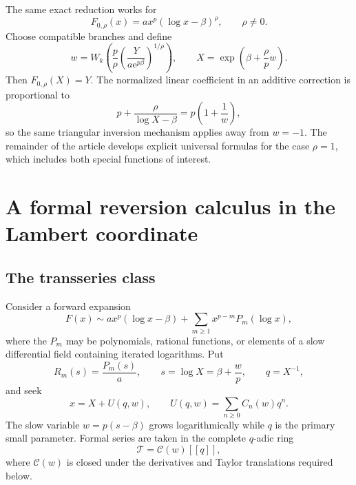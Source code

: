 \documentclass[11pt,a4paper]{article}
\numberwithin{equation}{section}
\theoremstyle{definition}
\theoremstyle{remark}
\newcommand{\e}{\mathrm e}
\newcommand{\Cfield}{\mathscr C}
\newcommand{\Tfield}{\mathscr T}
\begin{document}
The same exact reduction works for
\begin{equation}
 F_{0,\rho}(x)=a x^p(\log x-\beta)^\rho,
 \qquad \rho\neq0.
 \label{eq:F0-rho}
\end{equation}
Choose compatible branches and define
\begin{equation}
 w=W_k\!\left(
 \frac{p}{\rho}
 \left(\frac{Y}{a\e^{p\beta}}\right)^{1/\rho}
 \right),
 \qquad
 X=\exp\!\left(\beta+\frac{\rho}{p}w\right).
 \label{eq:rho-normalizer}
\end{equation}
Then \(F_{0,\rho}(X)=Y\).  The normalized linear coefficient in an
additive correction is proportional to
\begin{equation}
 p+\frac{\rho}{\log X-\beta}=p\left(1+\frac1w\right),
 \label{eq:rho-jacobian}
\end{equation}
so the same triangular inversion mechanism applies away from \(w=-1\).
The remainder of the article develops explicit universal formulas for the
case \(\rho=1\), which includes both special functions of interest.

\section{A formal reversion calculus in the Lambert coordinate}

\subsection{The transseries class}

Consider a forward expansion
\begin{equation}
 F(x)\sim a x^p(\log x-\beta)
 +\sum_{m\ge1}x^{p-m}P_m(\log x),
 \label{eq:general-forward}
\end{equation}
where the \(P_m\) may be polynomials, rational functions, or elements of a
slow differential field containing iterated logarithms.  Put
\begin{equation}
 R_m(s)=\frac{P_m(s)}a,
 \qquad
 s=\log X=\beta+\frac{w}{p},
 \qquad q=X^{-1},
 \label{eq:Rmsq}
\end{equation}
and seek
\begin{equation}
 x=X+U(q,w),
 \qquad
 U(q,w)=\sum_{n\ge0}C_n(w)q^n.
 \label{eq:U-series}
\end{equation}
The slow variable \(w=p(s-\beta)\) grows logarithmically while \(q\) is the
primary small parameter.  Formal series are taken in the complete
\(q\)-adic ring
\begin{equation}
 \Tfield=\Cfield(w)[[q]],
 \label{eq:Tfield}
\end{equation}
where \(\Cfield(w)\) is closed under the derivatives and Taylor
translations required below.
\end{document}
